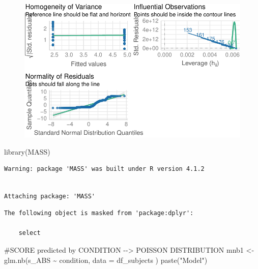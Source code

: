 \documentclass[
  letterpaper,
  DIV=11,
  numbers=noendperiod]{scrreprt}
\newenvironment{Shaded}{\begin{snugshade}}{\end{snugshade}}
\newcommand{\AttributeTok}[1]{\textcolor[rgb]{0.40,0.45,0.13}{#1}}
\newcommand{\CommentTok}[1]{\textcolor[rgb]{0.37,0.37,0.37}{#1}}
\newcommand{\FunctionTok}[1]{\textcolor[rgb]{0.28,0.35,0.67}{#1}}
\newcommand{\NormalTok}[1]{\textcolor[rgb]{0.00,0.23,0.31}{#1}}
\newcommand{\OtherTok}[1]{\textcolor[rgb]{0.00,0.23,0.31}{#1}}
\newcommand{\SpecialCharTok}[1]{\textcolor[rgb]{0.37,0.37,0.37}{#1}}
\newcommand{\StringTok}[1]{\textcolor[rgb]{0.13,0.47,0.30}{#1}}
\begin{document}
\begin{figure}[H]

{\centering \includegraphics{analysis/SGC3A/4_sgc3A_hypotesting_files/figure-pdf/DIAGNOSTICS-ABSCORE-POISSON-1.pdf}

}

\end{figure}

\begin{Shaded}
\begin{Highlighting}[]
\FunctionTok{library}\NormalTok{(MASS)}
\end{Highlighting}
\end{Shaded}

\begin{verbatim}
Warning: package 'MASS' was built under R version 4.1.2
\end{verbatim}

\begin{verbatim}

Attaching package: 'MASS'
\end{verbatim}

\begin{verbatim}
The following object is masked from 'package:dplyr':

    select
\end{verbatim}

\begin{Shaded}
\begin{Highlighting}[]
\CommentTok{\#SCORE predicted by CONDITION {-}{-}\textgreater{} POISSON DISTRIBUTION}
\NormalTok{mnb1 }\OtherTok{\textless{}{-}} \FunctionTok{glm.nb}\NormalTok{(s\_ABS }\SpecialCharTok{\textasciitilde{}}\NormalTok{ condition, }\AttributeTok{data =}\NormalTok{ df\_subjects )}
\FunctionTok{paste}\NormalTok{(}\StringTok{"Model"}\NormalTok{)}
\end{Highlighting}
\end{Shaded}
\end{document}
